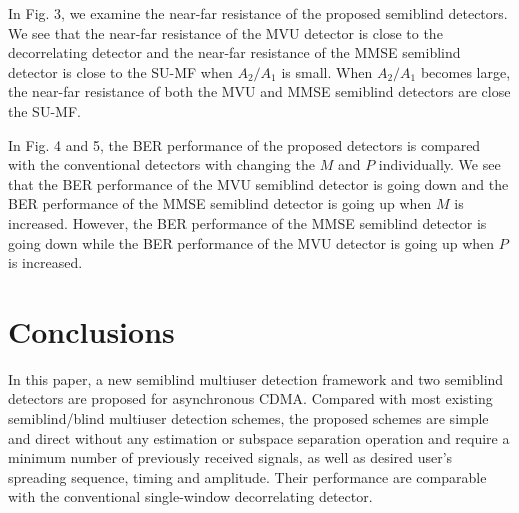 \documentclass[a4paper,10pt,fleqn, twocolumn]{IEEETran}
\begin{document}
In Fig. 3, we examine the near-far resistance of the proposed
semiblind detectors. We see that the near-far resistance of the
MVU detector is close to the decorrelating detector and the
near-far resistance of the MMSE semiblind detector is close to the
SU-MF when $A_2/A_1$ is small. When $A_2/A_1$ becomes large, the
near-far resistance of both the MVU and MMSE semiblind detectors
are close the SU-MF.
\begin{figure} \label{BER_M}
\end{figure}
\begin{figure} \label{BER_P}
\end{figure}
In Fig. 4 and 5, the BER performance of the proposed detectors is
compared with the conventional detectors with changing the $M$ and
$P$ individually. We see that the BER performance of the MVU
semiblind detector is going down and the BER performance of the
MMSE semiblind detector is going up when $M$ is increased.
However, the BER performance of the MMSE semiblind detector is
going down while the BER performance of the MVU detector is going
up when $P$ is increased.
\section{Conclusions}
In this paper, a new semiblind multiuser detection framework and
two semiblind detectors are proposed for asynchronous CDMA.
Compared with most existing semiblind/blind multiuser detection
schemes, the proposed schemes are simple and direct without any
estimation or subspace separation operation and require a minimum
number of previously received signals, as well as desired user's
spreading sequence, timing and amplitude. Their performance are
comparable with the conventional single-window decorrelating
detector.

\small


\end{document}
